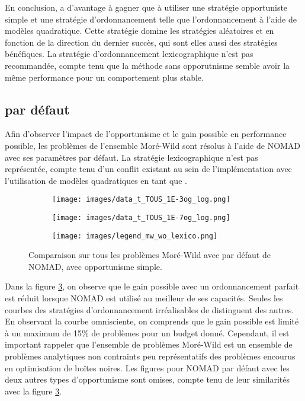 En conclusion, \MADS a d'avantage à gagner que \GPS à utiliser une stratégie opportuniste simple et une stratégie d'ordonnancement telle que l'ordonnancement à l'aide de modèles quadratique. Cette stratégie domine les stratégies aléatoires et en fonction de la direction du dernier succès, qui sont elles aussi des stratégies bénéfiques. La stratégie d'ordonnancement lexicographique n'est pas recommandée, compte tenu que la méthode sans opporutnisme semble avoir la même performance pour un comportement plus stable.

\subsection{\MADS par défaut}\label{sec:ctr}
Afin d'observer l'impact de l'opportunisme et le gain possible en performance possible, les problèmes de l'ensemble Moré-Wild sont résolus à l'aide de NOMAD avec ses paramètres par défaut. La stratégie lexicographique n'est pas représentée, compte tenu d'un conflit existant au sein de l'implémentation avec l'utilisation de modèles quadratiques en tant que \SEARCH.

\begin{figure}[!htb]
	\centering
	\begin{subfigure}{0.43\textwidth}
		\texttt{[image: images/data\_t\_TOUS\_1E-3og\_log.png]}
		\label{fig:data_t_TOUS_1E-3og_log}
	\end{subfigure}%
	\begin{subfigure}{0.43\textwidth}
		\texttt{[image: images/data\_t\_TOUS\_1E-7og\_log.png]}
		\label{fig:data_t_TOUS_1E-7og_log}
	\end{subfigure}
	\smallskip
	\begin{subfigure}{0.95\textwidth}
		\texttt{[image: images/legend\_mw\_wo\_lexico.png]}
	\end{subfigure}
	\caption{Comparaison sur tous les problèmes Moré-Wild avec \MADS par défaut de NOMAD, avec opportunisme simple.}
	\label{fig:true_mw}
\end{figure}

Dans la figure \ref{fig:true_mw}, on observe que le gain possible avec un ordonnancement parfait est réduit lorsque NOMAD est utilisé au meilleur de ses capacités. Seules les courbes des stratégies d'ordonnancement irréalisables de distinguent des autres. En observant la courbe omnisciente, on comprends que le gain possible est limité à un maximum de 15\% de problèmes pour un budget donné. Cependant, il est important rappeler que l'ensemble de problèmes Moré-Wild est un ensemble de problèmes analytiques non contraints peu représentatifs des problèmes encourus en optimisation de boîtes noires. Les figures pour NOMAD par défaut avec les deux autres types d'opportunisme sont omises, compte tenu de leur similarités avec la figure \ref{fig:true_mw}.

